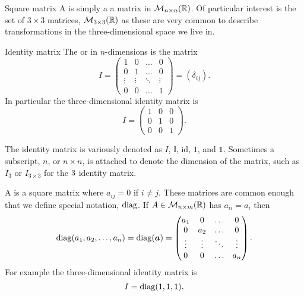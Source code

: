 \documentclass[a4paper]{article}
\newcommand{\nxmMatrices}[3]{\mathcal{M}_{{#1}\times{#2}}({#3})}
\renewcommand{\ident}{I}
\begin{document}
    \begin{definition}{Square matrix}{}
        A  is simply a a matrix in \(\nxmMatrices{n}{n}{\reals}\).
        Of particular interest is the set of \(3\times 3\) matrices, \(\nxmMatrices{3}{3}{\reals}\) as these are very common to describe transformations in the three-dimensional space we live in.
    \end{definition}
    \begin{definition}{Identity matrix}{}
        The  or  in \(n\)-dimensions is the matrix
        \[
            \ident = 
            \begin{pmatrix}
                1 & 0 & \dots & 0\\
                0 & 1 & \dots & 0\\
                \vdots & \vdots & \ddots & \vdots\\
                0 & 0 & \dots & 1
            \end{pmatrix}
            = (\delta_{ij}).
        \]
        In particular the three-dimensional identity matrix is
        \[
            \ident = 
            \begin{pmatrix}
                1 & 0 & 0\\
                0 & 1 & 0\\
                0 & 0 & 1
            \end{pmatrix}
            .
        \]
    \end{definition}
    \begin{notation*}{}
        The identity matrix is variously denoted as \(I\), \(\mathbb{I}\), \(\mathrm{id}\), \(1\), and \(\mathds{1}\).
        Sometimes a subscript, \(n\), or \(n\times n\), is attached to denote the dimension of the matrix, such as \(I_3\) or \(I_{3\times 3}\) for the \(3\time 3\) identity matrix.
    \end{notation*}
    \begin{notation*}{}
        A  is a square matrix where \(a_{ij} = 0\) if \(i \ne j\).
        These matrices are common enough that we define special notation, \(\operatorname{diag}\).
        If \(A\in\nxmMatrices{n}{m}{\reals}\) has \(a_{ii} = a_i\) then
        \[
            \operatorname{diag}(a_1, a_2, \dotsc, a_n) = \operatorname{diag}(\bm{a}) = 
            \begin{pmatrix}
                a_1 & 0 & \dots & 0\\
                0 & a_2 & \dots & 0\\
                \vdots & \vdots & \ddots & \vdots\\
                0 & 0 & \dots & a_n
            \end{pmatrix}
            .
        \]
        For example the three-dimensional identity matrix is
        \[\ident = \diag(1, 1, 1).\]
    \end{notation*}
\end{document}
